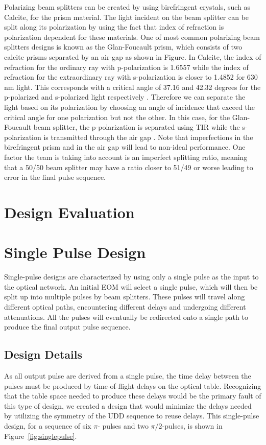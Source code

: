 \documentclass[pdftex,12pt,a4paper]{article}
\begin{document}
Polarizing beam splitters can be created by using birefringent crystals, such as Calcite, for the prism material. The light incident on the beam splitter can be split along its polarization by using the fact that index of refraction is polarization dependent for these materials. One of most common polarizing beam splitters designs is known as the Glan-Foucault prism, which consists of two calcite prisms separated by an air-gap as shown in Figure. In Calcite, the index of refraction for the ordinary ray with p-polarization is 1.6557 while the index of refraction for the extraordinary ray with s-polarization is closer to 1.4852 for 630 nm light. This corresponds with a critical angle of 37.16 and 42.32 degrees for the p-polarized and s-polarized light respectively \cite{Properties_of_Prisms}. Therefore we can separate the light based on its polarization by choosing an angle of incidence that exceed the critical angle for one polarization but not the other. In this case, for the Glan-Foucault beam splitter, the p-polarization is separated using TIR while the s-polarization is transmitted through the air gap \cite{Properties_of_Prisms}. Note that imperfections in the birefringent prism and in the air gap will lead to non-ideal performance. One factor the team is taking into account is an imperfect splitting ratio, meaning that a 50/50 beam splitter may have a ratio closer to 51/49 or worse leading to error in the final pulse sequence.


\section{Design Evaluation}
\label{sec:design_evaluation}

\section{Single Pulse Design}
\label{sec:single_pulse_design}
Single-pulse designs are characterized by using only a single pulse as the input to the optical network. An initial EOM will select a single pulse, which will then be split up into multiple pulses by beam splitters. These pulses will travel along different optical paths, encountering different delays and undergoing different attenuations. All the pulses will eventually be redirected onto a single path to produce the final output pulse sequence. 

\subsection{Design Details}
As all output pulse are derived from a single pulse, the time delay between the pulses must be produced by time-of-flight delays on the optical table. Recognizing that the table space needed to produce these delays would be the primary fault of this type of design, we created a design that would minimize the delays needed by utilizing the symmetry of the UDD sequence to reuse delays. This single-pulse design, for a sequence of six $\pi$- pulses and two $\pi/2$-pulses, is shown in Figure~\ref{fig:singlepulse}. 
\end{document}
